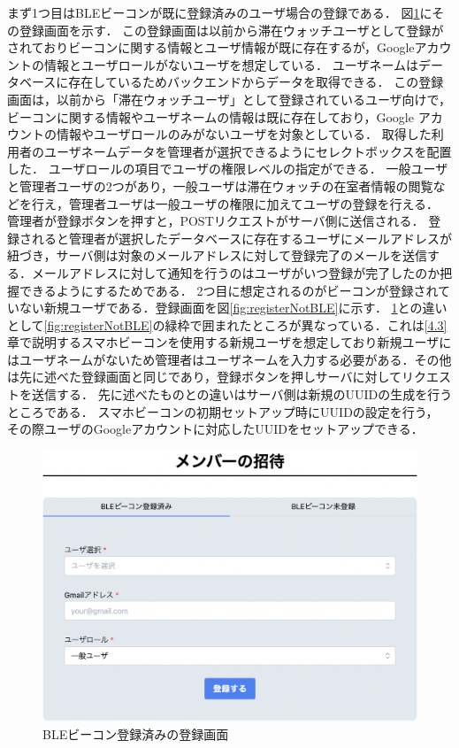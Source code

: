 まず1つ目はBLEビーコンが既に登録済みのユーザ場合の登録である．
図\ref{fig:registerBLE}にその登録画面を示す．
この登録画面は以前から滞在ウォッチユーザとして登録がされておりビーコンに関する情報とユーザ情報が既に存在するが，Googleアカウントの情報とユーザロールがないユーザを想定している．
ユーザネームはデータベースに存在しているためバックエンドからデータを取得できる．
この登録画面は，以前から「滞在ウォッチユーザ」として登録されているユーザ向けで，ビーコンに関する情報やユーザネームの情報は既に存在しており，Google アカウントの情報やユーザロールのみがないユーザを対象としている．
取得した利用者のユーザネームデータを管理者が選択できるようにセレクトボックスを配置した．
ユーザロールの項目でユーザの権限レベルの指定ができる．
一般ユーザと管理者ユーザの2つがあり，一般ユーザは滞在ウォッチの在室者情報の閲覧などを行え，管理者ユーザは一般ユーザの権限に加えてユーザの登録を行える．
管理者が登録ボタンを押すと，POSTリクエストがサーバ側に送信される．
登録されると管理者が選択したデータベースに存在するユーザにメールアドレスが紐づき，サーバ側は対象のメールアドレスに対して登録完了のメールを送信する．メールアドレスに対して通知を行うのはユーザがいつ登録が完了したのか把握できるようにするためである．
2つ目に想定されるのがビーコンが登録されていない新規ユーザである．登録画面を図\ref{fig:registerNotBLE}に示す．
\ref{fig:registerBLE}との違いとして\ref{fig:registerNotBLE}の緑枠で囲まれたところが異なっている．これは\ref{4.3}章で説明するスマホビーコンを使用する新規ユーザを想定しており新規ユーザにはユーザネームがないため管理者はユーザネームを入力する必要がある．その他は先に述べた登録画面と同じであり，登録ボタンを押しサーバに対してリクエストを送信する．
先に述べたものとの違いはサーバ側は新規のUUIDの生成を行うところである．
スマホビーコンの初期セットアップ時にUUIDの設定を行う，
その際ユーザのGoogleアカウントに対応したUUIDをセットアップできる．


\begin{figure}[tbh]
  \centering
  \includegraphics[width=16cm]{image/registerBLE.png}
  \caption{BLEビーコン登録済みの登録画面}\label{fig:registerBLE}

\end{figure}



